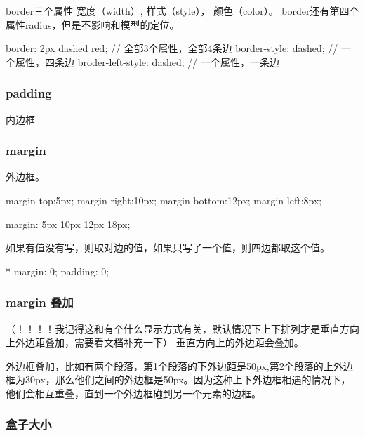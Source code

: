border三个属性 宽度（width）, 样式（style）， 颜色（color）。 border还有第四个属性radius，但是不影响和模型的定位。

\begin{CSS}[三个粒度]
{border: 2px dashed red;} // 全部3个属性，全部4条边
{border-style: dashed;} // 一个属性，四条边
{broder-left-style: dashed;} // 一个属性，一条边
\end{CSS}

\subsubsection{padding}

内边框

\subsubsection{margin}

外边框。

\begin{CSS}[上 右 下 左]


{margin-top:5px; margin-right:10px; margin-bottom:12px; margin-left:8px;}

{margin: 5px 10px 12px 18px;}

\end{CSS}

如果有值没有写，则取对边的值，如果只写了一个值，则四边都取这个值。


\begin{CSS}
* {margin: 0; padding: 0;}
\end{CSS}

\subsubsection{margin 叠加}

（！！！！我记得这和有个什么显示方式有关，默认情况下上下排列才是垂直方向上外边距叠加，需要看文档补充一下）
垂直方向上的外边距会叠加。

外边框叠加，比如有两个段落，第1个段落的下外边距是50px,第2个段落的上外边框为30px，那么他们之间的外边框是50px。因为这种上下外边框相遇的情况下，他们会相互重叠，直到一个外边框碰到另一个元素的边框。



\subsubsection{盒子大小}

